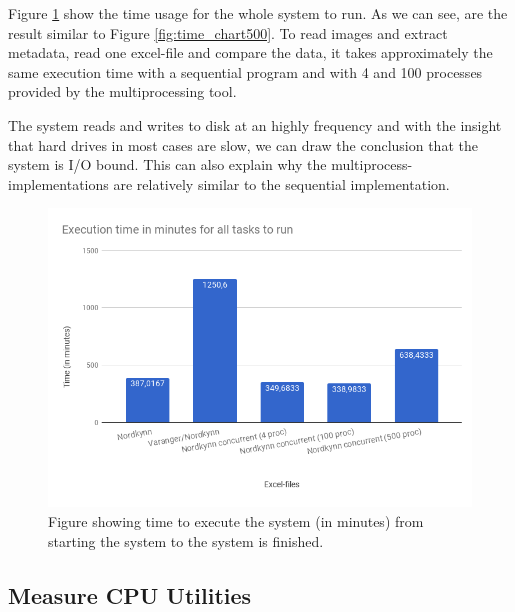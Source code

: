 \documentclass[USenglish]{uit-thesis}
\begin{document}
Figure \ref{fig:time_chart_overall} show the time usage for the whole system to run. As we can see, are the result similar to Figure \ref{fig:time_chart500}. To read images and extract metadata, read one excel-file and compare the data, it takes approximately the same execution time with a sequential program and with 4 and 100 processes provided by the multiprocessing tool.

The system reads and writes to disk at an highly frequency and with the insight that hard drives in most cases are slow, we can draw the conclusion that the system is I/O bound. This can also explain why the multiprocess-implementations are relatively similar to the sequential implementation.


\begin{figure}
\centering
\includegraphics[width=\textwidth]{chart2_done.png}
\caption{Figure showing time to execute the system (in minutes) from starting the system to the system is finished.}
\label{fig:time_chart_overall}
\end{figure}



\subsection{Measure CPU Utilities} \label{sec:eva_cpu}
\end{document}

